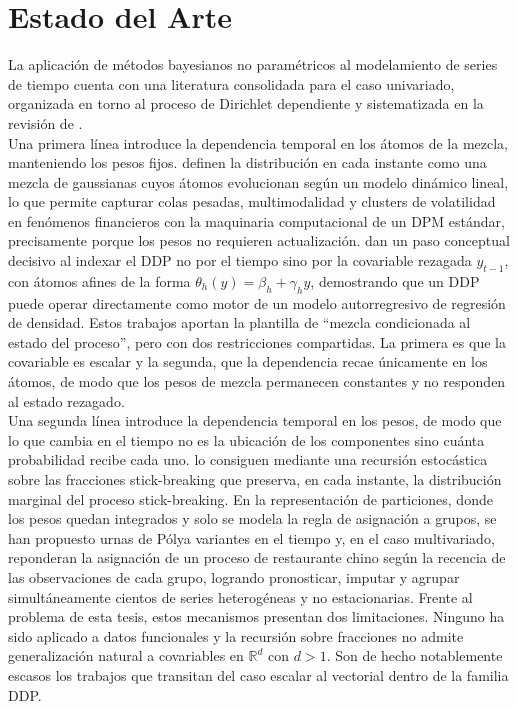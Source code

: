 \section{Estado del Arte}
\label{03_02_00_estado_arte}
 
La aplicación de métodos bayesianos no paramétricos al modelamiento de series de tiempo cuenta con una literatura consolidada para el caso univariado, organizada en torno al proceso de Dirichlet dependiente y sistematizada en la revisión de \citet{02_06_quintana2022dependent}.\\
 
Una primera línea introduce la dependencia temporal en los átomos de la mezcla, manteniendo los pesos fijos. \citet{03_01_rodriguez2008dynamic} definen la distribución en cada instante como una mezcla de gaussianas cuyos átomos evolucionan según un modelo dinámico lineal, lo que permite capturar colas pesadas, multimodalidad y clusters de volatilidad en fenómenos financieros con la maquinaria computacional de un DPM estándar, precisamente porque los pesos no requieren actualización. \citet{03_01_dilucca2013simple} dan un paso conceptual decisivo al indexar el DDP no por el tiempo sino por la covariable rezagada $y_{t-1}$, con átomos afines de la forma $\theta_h(y)=\beta_h+\gamma_h y$, demostrando que un DDP puede operar directamente como motor de un modelo autorregresivo de regresión de densidad. Estos trabajos aportan la plantilla de ``mezcla condicionada al estado del proceso'', pero con dos restricciones compartidas. La primera es que la covariable es escalar y la segunda, que la dependencia recae únicamente en los átomos, de modo que los pesos de mezcla permanecen constantes y no responden al estado rezagado.\\
 
Una segunda línea introduce la dependencia temporal en los pesos, de modo que lo que cambia en el tiempo no es la ubicación de los componentes sino cuánta probabilidad recibe cada uno. \citet{03_01_griffin2011stick} lo consiguen mediante una recursión estocástica sobre las fracciones stick-breaking que preserva, en cada instante, la distribución marginal del proceso stick-breaking. En la representación de particiones, donde los pesos quedan integrados y solo se modela la regla de asignación a grupos, se han propuesto urnas de Pólya variantes en el tiempo \citep{03_01_caron2007urna} y, en el caso multivariado, \citet{03_01_saad2018temporally} reponderan la asignación de un proceso de restaurante chino según la recencia de las observaciones de cada grupo, logrando pronosticar, imputar y agrupar simultáneamente cientos de series heterogéneas y no estacionarias. Frente al problema de esta tesis, estos mecanismos presentan dos limitaciones. Ninguno ha sido aplicado a datos funcionales y la recursión sobre fracciones no admite generalización natural a covariables en $\mathbb{R}^{d}$ con $d > 1$. Son de hecho notablemente escasos los trabajos que transitan del caso escalar al vectorial dentro de la familia DDP.\\
 
